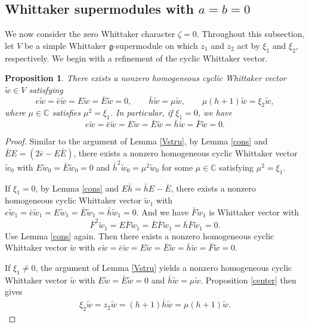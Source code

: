 \documentclass[a4paper,10pt]{article}
\theoremstyle{definition}
\theoremstyle{plain}
\newtheorem{proposition}[definition]{Proposition}
\theoremstyle{remark}
\theoremstyle{mystyle}
\numberwithin{equation}{section}
\begin{document}
\subsection{Whittaker supermodules with $a=b=0$}\label{s34}
We now consider the zero Whittaker character \(\zeta=0\). Throughout this subsection, let \(V\) be a simple Whittaker $\mathfrak g$-supermodule on which \(z_1\) and \(z_2\) act by \(\xi_1\) and \(\xi_2\), respectively. We begin with a refinement of the cyclic Whittaker vector.
\begin{proposition}\label{426}
    There exists a nonzero homogeneous cyclic Whittaker vector $\widetilde w\in V$ satisfying
    $$
    e\widetilde w=\bar e\widetilde w=E\widetilde w=\bar E\widetilde w=0,\qquad \bar h\widetilde w=\mu\widetilde w,\qquad \mu(h+1)\widetilde w=\xi_2 \widetilde w,
    $$
    where $\mu \in \mathbb C$ satisfies $\mu^2=\xi_1$. In particular, if $\xi_1=0$, we have
    $$
    e\widetilde w=\bar e\widetilde w=E\widetilde w=\bar E\widetilde w=\bar h\widetilde w=\bar F\widetilde w=0.
    $$
\end{proposition}
\begin{proof}
    Similar to the argument of Lemma \ref{Vstru}, by Lemma \ref{cons} and $\bar EE=(2\bar e-E\bar E)$, there exists a nonzero homogeneous cyclic Whittaker vector $\widetilde w_0$ with $E\widetilde w_0=\bar E\widetilde w_0=0$ and $\bar h^2\widetilde w_0=\mu ^2\widetilde w_0$ for some $\mu\in \mathbb C$ satisfying $\mu^2=\xi_1$. 
    
    If $\xi_1=0$, by Lemma \ref{cons} and $E\bar h=\bar hE-\bar E$, there exists a nonzero homogeneous cyclic Whittaker vector $\widetilde w_1$ with $e\widetilde w_1=\bar e\widetilde w_1=E\widetilde w_1=\bar E\widetilde w_1=\bar h\widetilde w_1=0$. And we have $\bar F\widetilde w_1$ is Whittaker vector with
    $$
    \bar F^2\widetilde w_1=E\bar F\widetilde w_1=\bar E\bar F\widetilde w_1=\bar h\bar F\widetilde w_1=0.
    $$
    Use Lemma \ref{cons} again. Then there exists a nonzero homogeneous cyclic Whittaker vector $\widetilde w$ with $e\widetilde w=\bar e\widetilde w=E\widetilde w=\bar E\widetilde w=\bar h\widetilde w=\bar F\widetilde w=0$.

    
    If $\xi_1\neq 0$, the argument of Lemma \ref{Vstru} yields a nonzero homogeneous cyclic Whittaker vector $\widetilde w$ with $E\widetilde w=\bar E\widetilde w=0$ and $\bar h\widetilde w=\mu \widetilde w$.
    Proposition \ref{center} then gives 
\begin{align*}
    \xi_2\widetilde w=z_2\widetilde w=(h+1)\bar h\widetilde w=\mu(h+1)\widetilde w.
\end{align*}
\end{proof}
\end{document}
